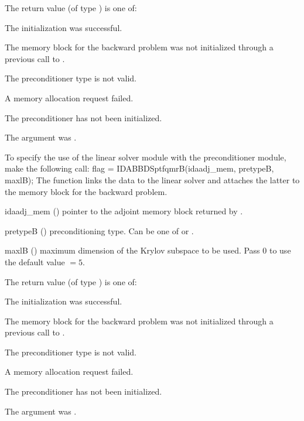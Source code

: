 {
  The return value  (of type ) is one of:
  \begin{args}
  \item[\Id{IDASPILS\_SUCCESS}] 
    The {\idaspbcg} initialization was successful.
  \item[\Id{IDASPILS\_MEM\_NULL}]
    The {\idas} memory block for the backward problem was not initialized through a 
    previous call to .
  \item[\Id{IDASPILS\_ILL\_INPUT}]
    The preconditioner type  is not valid.
  \item[\Id{IDASPILS\_MEM\_FAIL}]
    A memory allocation request failed.
  \item[\Id{IDABBDPRE\_PDATA\_NULL}]
    The {\idabbdpre} preconditioner has not been initialized.
  \item[\Id{IDABBDPRE\_ADJMEM\_NULL}]
    The  argument was .
  \end{args}
}
{}
To specify the use of the {\idasptfqmr} linear solver module with the {\idabbdpre} 
preconditioner module, make the following call:
{
  flag = IDABBDSptfqmrB(idaadj\_mem, pretypeB, maxlB);
}
{
  The function  links the {\idabbdpre} data to the
  {\idasptfqmr} linear solver and attaches the latter to the {\idas}
  memory block for the backward problem.
}
{
  \begin{args}
  \item[idaadj\_mem] ()
    pointer to the adjoint memory block returned by .
  \item[pretypeB] ()
    preconditioning type. Can be one of  or .
  \item[maxlB] ()
    maximum dimension of the Krylov subspace to be used. Pass $0$ to use the 
    default value $=5$.
  \end{args}
}
{
  The return value  (of type ) is one of:
  \begin{args}
  \item[\Id{IDASPILS\_SUCCESS}] 
    The {\idasptfqmr} initialization was successful.
  \item[\Id{IDASPILS\_MEM\_NULL}]
    The {\idas} memory block for the backward problem was not initialized through a 
    previous call to .
  \item[\Id{IDASPILS\_ILL\_INPUT}]
    The preconditioner type  is not valid.
  \item[\Id{IDASPILS\_MEM\_FAIL}]
    A memory allocation request failed.
  \item[\Id{IDABBDPRE\_PDATA\_NULL}]
    The {\idabbdpre} preconditioner has not been initialized.
  \item[\Id{IDABBDPRE\_ADJMEM\_NULL}]
    The  argument was .
  \end{args}
}
